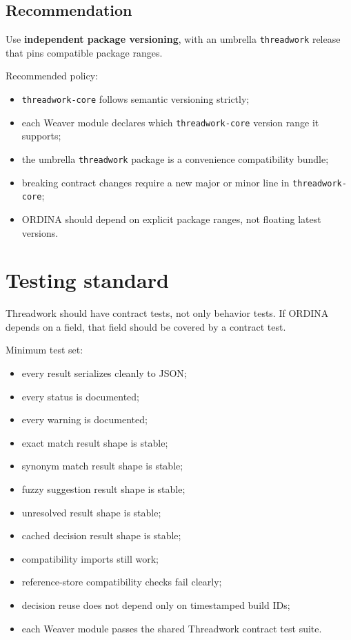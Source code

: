 \documentclass[11pt,a4paper]{article}
\newcommand{\code}[1]{\texttt{#1}}
\begin{document}
\subsection{Recommendation}

Use \textbf{independent package versioning}, with an umbrella \code{threadwork} release that pins compatible package ranges.

Recommended policy:

\begin{itemize}
  \item \code{threadwork-core} follows semantic versioning strictly;
  \item each Weaver module declares which \code{threadwork-core} version range it supports;
  \item the umbrella \code{threadwork} package is a convenience compatibility bundle;
  \item breaking contract changes require a new major or minor line in \code{threadwork-core};
  \item ORDINA should depend on explicit package ranges, not floating latest versions.
\end{itemize}

\section{Testing standard}

Threadwork should have contract tests, not only behavior tests. If ORDINA depends on a field, that field should be covered by a contract test.

Minimum test set:

\begin{itemize}
  \item every result serializes cleanly to JSON;
  \item every status is documented;
  \item every warning is documented;
  \item exact match result shape is stable;
  \item synonym match result shape is stable;
  \item fuzzy suggestion result shape is stable;
  \item unresolved result shape is stable;
  \item cached decision result shape is stable;
  \item compatibility imports still work;
  \item reference-store compatibility checks fail clearly;
  \item decision reuse does not depend only on timestamped build IDs;
  \item each Weaver module passes the shared Threadwork contract test suite.
\end{itemize}
\end{document}
